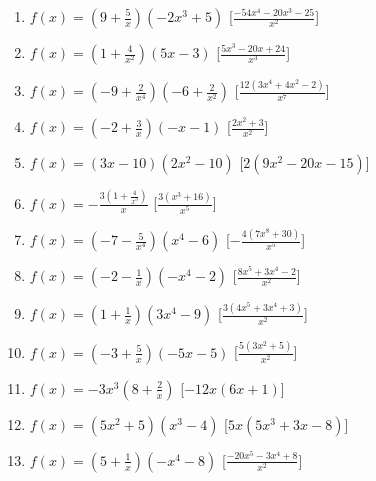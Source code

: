 \begin{enumerate}
\begin{enumerate}
\item \(f(x)=\left(9 + \frac{5}{x}\right) \left(- 2 x^{3} + 5\right)\)
  \hfill [\(\frac{- 54 x^{4} - 20 x^{3} - 25}{x^{2}}\)]
\item \(f(x)=\left(1 + \frac{4}{x^{2}}\right) \left(5 x - 3\right)\)
  \hfill [\(\frac{5 x^{3} - 20 x + 24}{x^{3}}\)]
\item \(f(x)=\left(-9 + \frac{2}{x^{4}}\right) \left(-6 + 
\frac{2}{x^{2}}\right)\)
  \hfill [\(\frac{12 \left(3 x^{4} + 4 x^{2} - 2\right)}{x^{7}}\)]
\item \(f(x)=\left(-2 + \frac{3}{x}\right) \left(- x - 1\right)\)
  \hfill [\(\frac{2 x^{2} + 3}{x^{2}}\)]
\item \(f(x)=\left(3 x - 10\right) \left(2 x^{2} - 10\right)\)
  \hfill [\(2 \left(9 x^{2} - 20 x - 15\right)\)]
\item \(f(x)=- \frac{3 \left(1 + \frac{4}{x^{3}}\right)}{x}\)
  \hfill [\(\frac{3 \left(x^{3} + 16\right)}{x^{5}}\)]
\item \(f(x)=\left(-7 - \frac{5}{x^{4}}\right) \left(x^{4} - 6\right)\)
  \hfill [\(- \frac{4 \left(7 x^{8} + 30\right)}{x^{5}}\)]
\item \(f(x)=\left(-2 - \frac{1}{x}\right) \left(- x^{4} - 2\right)\)
  \hfill [\(\frac{8 x^{5} + 3 x^{4} - 2}{x^{2}}\)]
\item \(f(x)=\left(1 + \frac{1}{x}\right) \left(3 x^{4} - 9\right)\)
  \hfill [\(\frac{3 \left(4 x^{5} + 3 x^{4} + 3\right)}{x^{2}}\)]
\item \(f(x)=\left(-3 + \frac{5}{x}\right) \left(- 5 x - 5\right)\)
  \hfill [\(\frac{5 \left(3 x^{2} + 5\right)}{x^{2}}\)]
\item \(f(x)=- 3 x^{3} \left(8 + \frac{2}{x}\right)\)
  \hfill [\(- 12 x \left(6 x + 1\right)\)]
\item \(f(x)=\left(5 x^{2} + 5\right) \left(x^{3} - 4\right)\)
  \hfill [\(5 x \left(5 x^{3} + 3 x - 8\right)\)]
\item \(f(x)=\left(5 + \frac{1}{x}\right) \left(- x^{4} - 8\right)\)
  \hfill [\(\frac{- 20 x^{5} - 3 x^{4} + 8}{x^{2}}\)]



\end{enumerate}
\end{enumerate}
